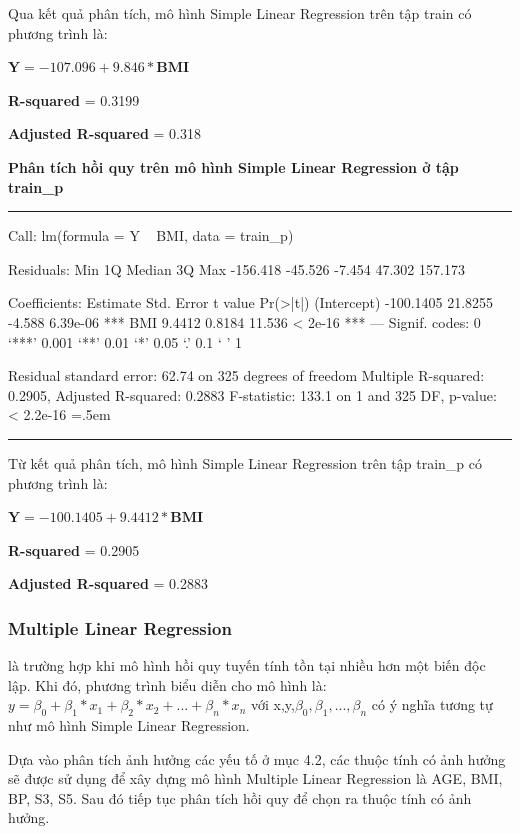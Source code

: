\documentclass[runningheads]{llncs}
\newenvironment{lcverbatim}
 {\SaveVerbatim{cverb}}
 {\endSaveVerbatim
  \flushleft\fboxrule=0pt\fboxsep=.5em
  \colorbox{cverbbg}{%
    \makebox[\dimexpr\linewidth-2\fboxsep][l]{\BUseVerbatim{cverb}}%
  }
  \endflushleft
}
\begin{document}
Qua kết quả phân tích, mô hình Simple Linear Regression trên tập train có phương trình là:
\begin{center}
	$\textbf{Y}=  -107.096 + 9.846*\textbf{BMI}$
\end{center}

\textbf{R-squared} = 0.3199

\textbf{Adjusted R-squared} = 0.318

\vspace{0.5cm}
\textbf{Phân tích hồi quy trên mô hình Simple Linear Regression ở tập train\_p}
\vspace{0.5cm}
\hrule
\begin{lcverbatim}
Call:
lm(formula = Y ~ BMI, data = train_p)

Residuals:
     Min       1Q   Median       3Q      Max 
-156.418  -45.526   -7.454   47.302  157.173 

Coefficients:
             Estimate Std. Error t value Pr(>|t|)    
(Intercept) -100.1405    21.8255  -4.588 6.39e-06 ***
BMI            9.4412     0.8184  11.536  < 2e-16 ***
---
Signif. codes:  0 ‘***’ 0.001 ‘**’ 0.01 ‘*’ 0.05 ‘.’ 0.1 ‘ ’ 1

Residual standard error: 62.74 on 325 degrees of freedom
Multiple R-squared:  0.2905,	Adjusted R-squared:  0.2883 
F-statistic: 133.1 on 1 and 325 DF,  p-value: < 2.2e-16
\end{lcverbatim}
\hrule
\vspace{0.5cm}

Từ kết quả phân tích, mô hình Simple Linear Regression trên tập train\_p có phương trình là:
\begin{center}
	$\textbf{Y}=  -100.1405 + 9.4412*\textbf{BMI}$
\end{center}

\textbf{R-squared} = 0.2905 

\textbf{Adjusted R-squared} = 0.2883

\subsubsection{Multiple Linear Regression} là trường hợp khi mô hình hồi quy tuyến tính tồn tại nhiều hơn một biến độc lập. Khi đó, phương trình biểu diễn cho mô hình là: $y= \beta_0 +\beta_1*x_1+\beta_2*x_2+...+\beta_n*x_n$ với x,y,$\beta_0, \beta_1,...,\beta_n$ có ý nghĩa tương tự như mô hình Simple Linear Regression.

Dựa vào phân tích ảnh hưởng các yếu tố ở mục 4.2, các thuộc tính có ảnh hưởng sẽ được sử dụng để xây dựng mô hình Multiple Linear Regression là AGE, BMI, BP, S3, S5. Sau đó tiếp tục phân tích hồi quy để chọn ra thuộc tính có ảnh hưởng.
\end{document}
